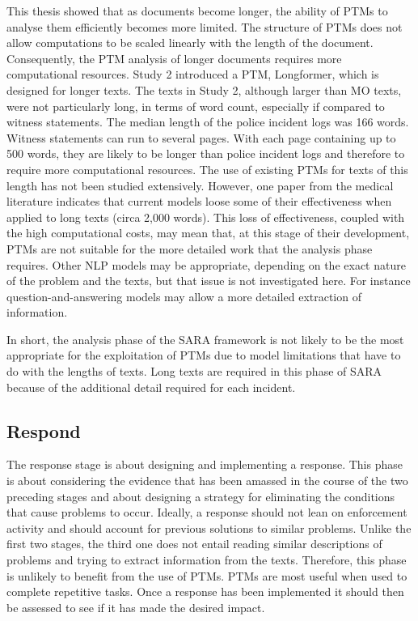 This thesis showed that as documents become longer, the ability of PTMs to analyse them efficiently becomes more limited. The structure of PTMs does not allow computations to be scaled linearly with the length of the document. Consequently, the PTM analysis of longer documents requires more computational resources. Study 2 introduced a PTM, Longformer, which is designed for longer texts. The texts in Study 2, although larger than MO texts, were not particularly long, in terms of word count, especially if compared to witness statements. The median length of the police incident logs was 166 words. Witness statements can run to several pages. With each page containing up to 500 words, they are likely to be longer than police incident logs and therefore to require more computational resources. The use of existing PTMs for texts of this length has not been studied extensively. However, one paper from the medical literature \parencite{limitations_of_transformers}  indicates that current models loose some of their effectiveness when applied to long texts (circa 2,000 words). This loss of effectiveness, coupled with the high computational costs, may mean that, at this stage of their development, PTMs are not suitable for the more detailed work that the analysis phase requires. Other NLP models may be appropriate, depending on the exact nature of the problem and the texts, but that issue is not investigated here. For instance question-and-answering models may allow a more detailed extraction of information.  

In short, the analysis phase of the SARA framework is not likely to be the most appropriate for the exploitation of PTMs due to model limitations that have to do with the lengths of texts. Long texts are required in this phase of SARA because of the additional detail required for each incident.


\subsection{Respond} The response stage is about designing and implementing a response. This phase is about considering the evidence that has been amassed in the course of the two preceding stages and about designing a strategy for eliminating the conditions that cause problems to occur. Ideally, a response should not lean on enforcement activity and should account for previous solutions to similar problems. Unlike the first two stages, the third one does not entail reading similar descriptions of problems and trying to extract information from the texts. Therefore, this phase is unlikely to benefit from the use of PTMs. PTMs are most useful when used to complete repetitive tasks. Once a response has been implemented it should then be assessed to see if it has made the desired impact. 

